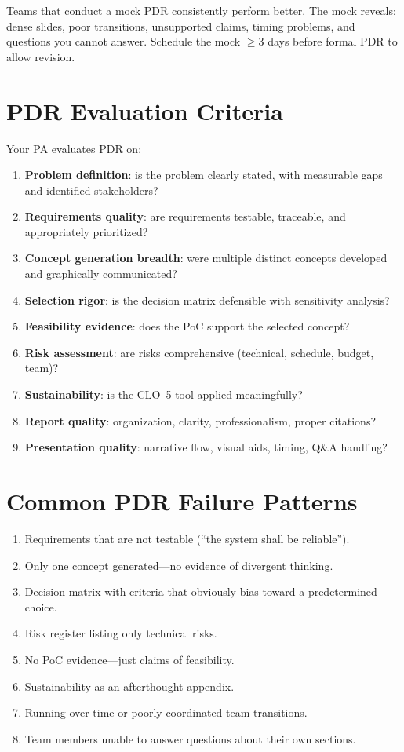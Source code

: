 \begin{tipbox}
Teams that conduct a mock PDR consistently perform better. The mock reveals: dense slides, poor transitions, unsupported claims, timing problems, and questions you cannot answer. Schedule the mock $\geq$3 days before formal PDR to allow revision.
\end{tipbox}

\section{PDR Evaluation Criteria}
Your PA evaluates PDR on:
\begin{enumerate}[nosep,leftmargin=1.5em]
\item \textbf{Problem definition}: is the problem clearly stated, with measurable gaps and identified stakeholders?
\item \textbf{Requirements quality}: are requirements testable, traceable, and appropriately prioritized?
\item \textbf{Concept generation breadth}: were multiple distinct concepts developed and graphically communicated?
\item \textbf{Selection rigor}: is the decision matrix defensible with sensitivity analysis?
\item \textbf{Feasibility evidence}: does the PoC support the selected concept?
\item \textbf{Risk assessment}: are risks comprehensive (technical, schedule, budget, team)?
\item \textbf{Sustainability}: is the CLO~5 tool applied meaningfully?
\item \textbf{Report quality}: organization, clarity, professionalism, proper citations?
\item \textbf{Presentation quality}: narrative flow, visual aids, timing, Q\&A handling?
\end{enumerate}

\section{Common PDR Failure Patterns}
\begin{enumerate}[nosep,leftmargin=1.5em]
\item Requirements that are not testable (``the system shall be reliable'').
\item Only one concept generated---no evidence of divergent thinking.
\item Decision matrix with criteria that obviously bias toward a predetermined choice.
\item Risk register listing only technical risks.
\item No PoC evidence---just claims of feasibility.
\item Sustainability as an afterthought appendix.
\item Running over time or poorly coordinated team transitions.
\item Team members unable to answer questions about their own sections.
\end{enumerate}

